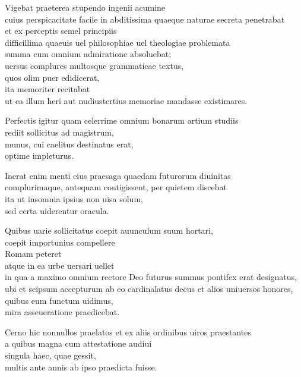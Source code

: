 \documentclass[a5paper,twoside]{article}
\begin{document}
Vigebat praeterea stupendo ingenii acumine \\
cuius perspicacitate facile in abditissima quaeque naturae secreta penetrabat \\
et ex perceptis semel principiis \\
difficillima quaeuis uel philosophiae uel theologiae problemata \\
summa cum omnium admiratione absoluebat; \\
uersus complures multosque grammaticae textus, \\
quos olim puer edidicerat, \\
ita memoriter recitabat \\
ut ea illum heri aut nudiustertius memoriae mandasse existimares. 

Perfectis igitur quam celerrime omnium bonarum artium studiis \\
rediit sollicitus ad magistrum, \\
munus, cui caelitus destinatus erat, \\
optime impleturus.  

Inerat enim menti eius praesaga quaedam futurorum diuinitas \\
complurimaque, antequam contigissent, per quietem discebat \\
ita ut insomnia ipsius non uisa solum, \\
sed certa uiderentur oracula. 

Quibus uarie sollicitatus coepit auunculum suum hortari, \\
coepit importunius compellere \\
Romam peteret \\
atque in ea urbe uersari uellet \\
in qua a maximo omnium rectore Deo futurus summus pontifex erat designatus, \\
ubi et seipsum accepturum ab eo cardinalatus decus et alios uniuersos honores, \\
quibus eum functum uidimus, \\
mira asseueratione praedicebat. 

Cerno hic nonnullos praelatos et ex aliis ordinibus uiros praestantes \\
a quibus magna cum attestatione audiui \\
singula haec, quae gessit, \\
multis ante annis ab ipso praedicta fuisse.  
\end{document}

